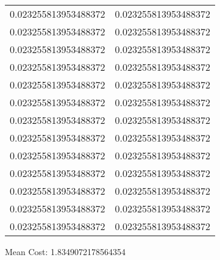 \documentclass[12pt]{article}
\begin{document}
\begin{tabular}{l l}
0.023255813953488372	&	0.023255813953488372\\
0.023255813953488372	&	0.023255813953488372\\
0.023255813953488372	&	0.023255813953488372\\
0.023255813953488372	&	0.023255813953488372\\
0.023255813953488372	&	0.023255813953488372\\
0.023255813953488372	&	0.023255813953488372\\
0.023255813953488372	&	0.023255813953488372\\
0.023255813953488372	&	0.023255813953488372\\
0.023255813953488372	&	0.023255813953488372\\
0.023255813953488372	&	0.023255813953488372\\
0.023255813953488372	&	0.023255813953488372\\
0.023255813953488372	&	0.023255813953488372\\
0.023255813953488372	&	0.023255813953488372\\
\end{tabular}\newpage
\noindent
\noindent Mean Cost: 1.8349072178564354\\
\end{document}
